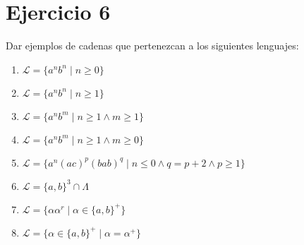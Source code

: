\documentclass[12pt]{article}
\begin{document}
\section{Ejercicio 6}
Dar ejemplos de cadenas que pertenezcan a los siguientes lenguajes:
\begin{enumerate}[label=\Roman*.]
    \item $\mathcal{L} = \{a^nb^n \mid n\geq 0\}$
    \item $\mathcal{L} = \{a^nb^n \mid n\geq 1\}$
    \item $\mathcal{L} = \{a^nb^m \mid n\geq 1 \land m\geq 1\}$
    \item $\mathcal{L} = \{a^nb^m \mid n\geq 1 \land m\geq 0\}$
    \item $\mathcal{L} = \{a^n(ac)^p(bab)^q \mid n \leq 0 \land q = p +2 \land p \geq 1\}$
    \item $\mathcal{L} =  \{a,b\}^3 \cap \Lambda$
    \item $\mathcal{L} = \{ \alpha\alpha^r \mid \alpha \in \{a,b\}^+\}$
    \item $\mathcal{L} = \{ \alpha \in \{a,b\}^+ \mid \alpha = \alpha^+\}$
\end{enumerate}
\end{document}

